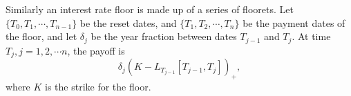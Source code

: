Similarly an interest rate floor is made up of a series of floorets. 
Let $\{T_0,T_1,\cdots,T_{n-1}\}$ be the reset dates, and
$\{T_1,T_2,\cdots,T_{n}\}$ be the payment dates of the floor, 
and let $\delta_{j}$ be the year fraction between dates $T_{j-1}$ and $T_j$.
At time $T_j,j=1,2,\cdots n$, the payoff is
\begin{equation} \label{E:cap}
  \delta_j \left( K - L_{T_{j-1}}[T_{j-1},T_j] \right)_+,
\end{equation}
where $K$ is the strike for the floor.


